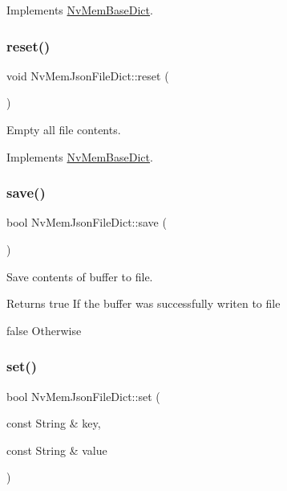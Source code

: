 Implements \mbox{\hyperlink{class_nv_mem_base_dict_a11d82ceaa4bb8b003080a1640ba40446}{Nv\+Mem\+Base\+Dict}}.

\mbox{\label{class_nv_mem_json_file_dict_aa66c932e83655464e279861f1685e2ff}} 
\subsubsection{\texorpdfstring{reset()}{reset()}}
{\footnotesize\ttfamily void Nv\+Mem\+Json\+File\+Dict\+::reset (\begin{DoxyParamCaption}{ }\end{DoxyParamCaption})\hspace{0.3cm}{\ttfamily [virtual]}}



Empty all file contents. 



Implements \mbox{\hyperlink{class_nv_mem_base_dict_a1ae6a2c04b8adb81fc68e0abfd01c011}{Nv\+Mem\+Base\+Dict}}.

\mbox{\label{class_nv_mem_json_file_dict_aee40593d8ea5dd5ecb3fead948b931b0}} 
\subsubsection{\texorpdfstring{save()}{save()}}
{\footnotesize\ttfamily bool Nv\+Mem\+Json\+File\+Dict\+::save (\begin{DoxyParamCaption}{ }\end{DoxyParamCaption})}



Save contents of buffer to file. 

\begin{DoxyReturn}{Returns}
true If the buffer was successfully writen to file 

false Otherwise 
\end{DoxyReturn}
\mbox{\label{class_nv_mem_json_file_dict_aec669b13cce54561e2f26074dea4d10d}} 
\subsubsection{\texorpdfstring{set()}{set()}}
{\footnotesize\ttfamily bool Nv\+Mem\+Json\+File\+Dict\+::set (\begin{DoxyParamCaption}\item[{const String \&}]{key,  }\item[{const String \&}]{value }\end{DoxyParamCaption})\hspace{0.3cm}{\ttfamily [virtual]}}



